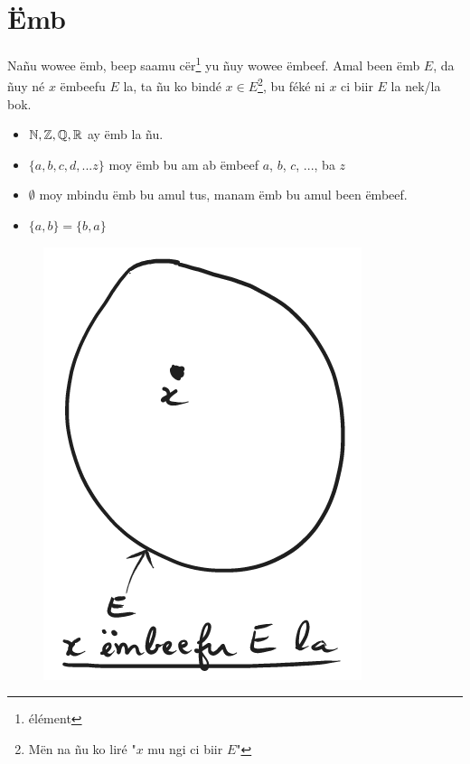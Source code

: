 \documentclass[twoside, a4paper]{article}
\begin{document}
\section{Ëmb}
\begin{tcolorbox}[enhanced jigsaw,breakable,pad at break*=1mm,
    colback=red!5!white,colframe=white!75!black,title= Téeki,
    watermark color=white]
  Nañu wowee ëmb, beep saamu cër\footnote{élément} yu ñuy wowee ëmbeef. Amal been ëmb $E$, da ñuy né $x$ ëmbeefu $E$ la, ta ñu ko bindé $x\in E$\footnote{Mën na ñu ko liré "$x$ mu ngi ci biir $E$"}, bu féké ni $x$ ci biir $E$ la nek/la bok.
\end{tcolorbox}

\begin{itemize}
  \item $\mathbb{N}, \mathbb{Z}, \mathbb{Q}, \mathbb{R}$ ay ëmb la ñu.
  \item $\{a, b, c, d, ... z\}$ moy ëmb bu am ab ëmbeef $a$, $b$, $c$, ..., ba $z$
  \item $\emptyset$ moy mbindu ëmb bu amul tus, manam ëmb bu amul been ëmbeef.
  \item $\{a, b\} = \{b, a\}$
\end{itemize}
\begin{figure}[ht]
  \centering
  \includegraphics[scale = 0.5]{image/embeefu_emb.png}
  \label{fig:embeefu_emb}
\end{figure}
\end{document}

